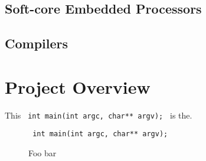\documentclass[11pt,a4paper]{report}
\begin{document}
\subsection{Soft-core Embedded Processors}
\lipsum[1-2]
\subsection{Compilers}
\lipsum[1-2]
\section{Project Overview}
\lipsum[1-2]

This \texttt{
int main(int argc, char** argv);
} is the.

\begin{figure}[H]
\centering
\texttt{
int main(int argc, char** argv);
}
\caption{Foo bar}
\end{figure}
\end{document}
